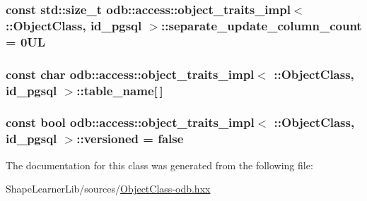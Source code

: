 \subsubsection[{separate\+\_\+update\+\_\+column\+\_\+count}]{\setlength{\rightskip}{0pt plus 5cm}const std\+::size\+\_\+t odb\+::access\+::object\+\_\+traits\+\_\+impl$<$ \+::{\bf Object\+Class}, id\+\_\+pgsql $>$\+::separate\+\_\+update\+\_\+column\+\_\+count = 0\+U\+L\hspace{0.3cm}{\ttfamily [static]}}\label{classodb_1_1access_1_1object__traits__impl_3_01_1_1_object_class_00_01id__pgsql_01_4_a92c70722158781c7c76ec5d1b4ed0dce}
\hypertarget{classodb_1_1access_1_1object__traits__impl_3_01_1_1_object_class_00_01id__pgsql_01_4_ad940fdd97f399480a2afb4fcc9c97285}{}
\subsubsection[{table\+\_\+name}]{\setlength{\rightskip}{0pt plus 5cm}const char odb\+::access\+::object\+\_\+traits\+\_\+impl$<$ \+::{\bf Object\+Class}, id\+\_\+pgsql $>$\+::table\+\_\+name\mbox{[}$\,$\mbox{]}\hspace{0.3cm}{\ttfamily [static]}}\label{classodb_1_1access_1_1object__traits__impl_3_01_1_1_object_class_00_01id__pgsql_01_4_ad940fdd97f399480a2afb4fcc9c97285}
\hypertarget{classodb_1_1access_1_1object__traits__impl_3_01_1_1_object_class_00_01id__pgsql_01_4_aa7d37ed39a824128e872431b9273bd7c}{}
\subsubsection[{versioned}]{\setlength{\rightskip}{0pt plus 5cm}const {\bf bool} odb\+::access\+::object\+\_\+traits\+\_\+impl$<$ \+::{\bf Object\+Class}, id\+\_\+pgsql $>$\+::versioned = false\hspace{0.3cm}{\ttfamily [static]}}\label{classodb_1_1access_1_1object__traits__impl_3_01_1_1_object_class_00_01id__pgsql_01_4_aa7d37ed39a824128e872431b9273bd7c}


The documentation for this class was generated from the following file\+:\begin{DoxyCompactItemize}
\item 
Shape\+Learner\+Lib/sources/\hyperlink{_object_class-odb_8hxx}{Object\+Class-\/odb.\+hxx}\end{DoxyCompactItemize}
